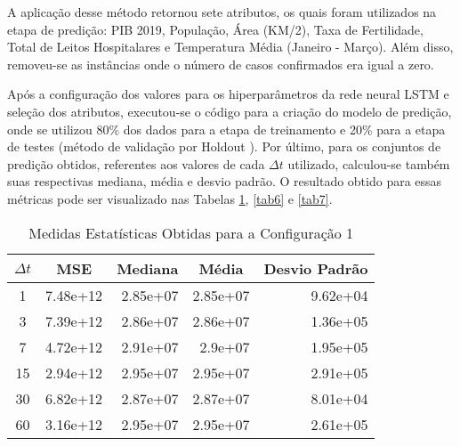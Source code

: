 \documentclass{ieeeaccess}
\begin{document}
A aplicação desse método retornou sete atributos, os quais foram utilizados na etapa de predição: PIB 2019, População, Área (KM/2), Taxa de Fertilidade, Total de Leitos Hospitalares e Temperatura Média (Janeiro - Março). Além disso, removeu-se as instâncias onde o número de casos confirmados era igual a zero.

Após a configuração dos valores para os hiperparâmetros da rede neural LSTM e seleção dos atributos, executou-se o código para a criação do modelo de predição, onde se utilizou 80\% dos dados para a etapa de treinamento e 20\% para a etapa de testes (método de validação por Holdout \cite{b25}). Por último, para os conjuntos de predição obtidos, referentes aos valores de cada $\Delta t$ utilizado, calculou-se também suas respectivas mediana, média e desvio padrão. O resultado obtido para essas métricas pode ser visualizado nas Tabelas \ref{tab5}, \ref{tab6} e \ref{tab7}.

\begin{table}[!h]
	\caption{Medidas Estatísticas Obtidas para a Configuração 1} %
	\label{tab5}
	\setlength{\tabcolsep}{3pt}
	\setlength\extrarowheight{2.5pt}
	
	\centering
	\begin{tabular}{| c | r | r | r | r |}
		\hline
		\multicolumn{1}{|c|}{$\Delta t$} &\multicolumn{1}{c|}{MSE} & \multicolumn{1}{c|}{Mediana} & \multicolumn{1}{c|}{Média} & \multicolumn{1}{c|}{Desvio Padrão} \\ \hline
		
		1 & 7.48e+12 & 2.85e+07 & 2.85e+07 & 9.62e+04 \\
		3 & 7.39e+12 & 2.86e+07 & 2.86e+07 & 1.36e+05 \\
		7 & 4.72e+12 & 2.91e+07 & 2.9e+07 & 1.95e+05 \\
		15 & 2.94e+12 & 2.95e+07 & 2.95e+07 & 2.91e+05 \\
		30 & 6.82e+12 & 2.87e+07 & 2.87e+07 & 8.01e+04 \\
		60 & 3.16e+12 & 2.95e+07 & 2.95e+07 & 2.61e+05 \\ \hline
		
	\end{tabular}
\end{table}
\end{document}
